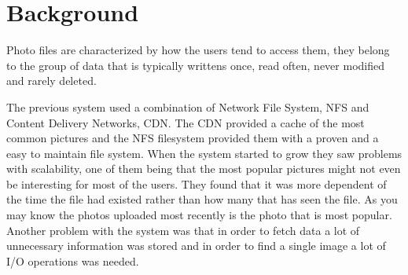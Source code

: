 \section{Background}
Photo files are characterized by how the users tend to access them, they belong
to the group of data that is typically writtens once, read often, never modified
and rarely deleted.

The previous system used a combination of Network File System, NFS and Content
Delivery Networks, CDN. The CDN provided a cache of the most common pictures and
the NFS filesystem provided them with a proven and a easy to maintain file system.
When the system started to grow they saw problems with scalability, one of them
being that the most popular pictures might not even be interesting for most of the
users. They found that it was more dependent of the time the file had existed rather
than how many that has seen the file. As you may know the photos uploaded most recently
is the photo that is most popular. Another problem with the system was that in order
to fetch data a lot of unnecessary information was stored and in order to find a 
single image a lot of I/O operations was needed.\\

